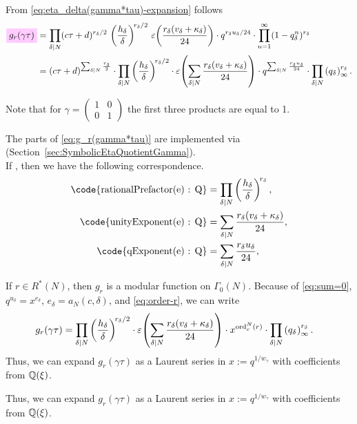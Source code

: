 \documentclass{article}
\begin{document}
\begin{Hemmecke}
From \eqref{eq:eta_delta(gamma*tau)-expansion} follows
\begin{align}
  \defineNotation[g-r-gamma-tau]{g_r(\gamma \tau)}
  &=
  \divisorprod{N}
  (c \tau+d)^{r_\delta/2}
  \,
  \left(\frac{h_\delta}{\delta}\right)^{\!r_\delta/2}
  \,
  \unityPower{\frac{r_\delta(v_\delta + \kappa_\delta)}{24}}
  \cdot
  q^{r_\delta u_\delta/24}
  \cdot
    \prod_{n=1}^{\infty}(1-q_\delta^n)^{r_\delta}
  \notag
  \\
  &=
  (c \tau+d)^{\divisorsum{N} \frac{r_\delta}{2}}
  \cdot
  \divisorprod{N}
  \left(\frac{h_\delta}{\delta}\right)^{\!r_\delta/2}
  \cdot
  \unityPower{\divisorsum{N} \frac{r_\delta(v_\delta + \kappa_\delta)}{24}}
  \cdot
  q^{\divisorsum{N} \frac{r_\delta u_\delta}{24}}
  \cdot
  \divisorprod{N} \eulerFunction[q_\delta]{}^{r_\delta}.
  \label{eq:g_r(gamma*tau)}
\end{align}

Note that for
$\gamma=\left(\begin{smallmatrix}1&0\\0&1\end{smallmatrix}\right)$ the
first three products are equal to 1.


The parts of \eqref{eq:g_r(gamma*tau)} are implemented via
\textcolor{blue}{}
(Section~\ref{sec:SymbolicEtaQuotientGamma}).
\\
If , then we have the following
correspondence.
\begin{align*}
  \text{\code{rationalPrefactor(e) : Q}}
  &=
    \divisorprod{N} \left(\frac{h_\delta}{\delta}\right)^{\!r_\delta},
  \\
  \text{\code{unityExponent(e) : Q}}
  &=
    \divisorsum{N} \frac{r_\delta(v_\delta + \kappa_\delta)}{24},
  \\
  \text{\code{qExponent(e) : Q}}
  &=
    \divisorsum{N} \frac{r_\delta u_\delta}{24},
\end{align*}

If $r\in R^*(N)$, then $g_r$ is a modular function on $\Gamma_0(N)$.
Because of \eqref{eq:sum=0}, $q^{u_\delta}=x^{e_\delta}$,
$e_\delta=a_N(c, \delta)$, and \eqref{eq:order-r}, we can write
\begin{align}
  g_r(\gamma \tau)
  &=
  \divisorprod{N}
  \left(\frac{h_\delta}{\delta}\right)^{\!r_\delta/2}
  \cdot
  \unityPower{\divisorsum{N} \frac{r_\delta(v_\delta + \kappa_\delta)}{24}}
  \cdot
  x^{\ord^N_c(r)}
  \cdot
  \divisorprod{N} \eulerFunction[q_\delta]{}^{r_\delta}.
  \label{eq:modular-g_r(gamma*tau)}
\end{align}
Thus, we can expand $g_r(\gamma\tau)$ as a Laurent series in
$x:=q^{1/w_\gamma}$ with coefficients from $\mathbb{Q}(\xi)$.


Thus, we can expand $g_r(\gamma\tau)$ as a Laurent series in
$x:=q^{1/w_\gamma}$ with coefficients from $\mathbb{Q}(\xi)$.


\end{Hemmecke}
\end{document}
